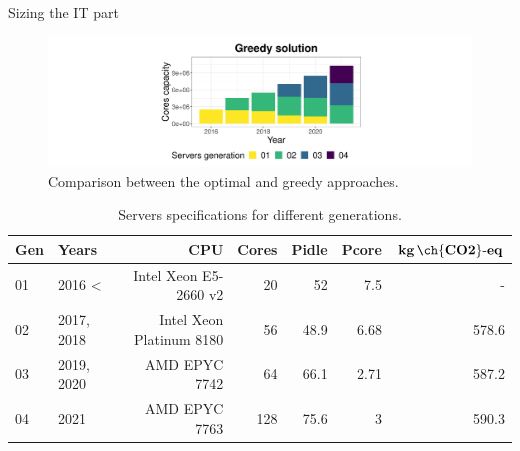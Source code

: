 \documentclass[Ligatures=TeX,table,svgnames,usetotalslideindicator,compress,10pt,aspectratio=169]{beamer}
\begin{document}
\begin{frame}{Sizing the IT part}
  \begin{center}
    \begin{figure}[h]    
      \centering
      \includegraphics[width=.9\textwidth]{images/cloud_federation_evolution_lifetime_year6.png}
      \caption{Comparison between the optimal and greedy approaches.}
    \end{figure}    
  \end{center}  

  \begin{table}[h]
  \tiny
  \label{tab:servers_specs} 
  \caption{Servers specifications for different generations.} \centering
  \begin{tabular}{|l|l|r|r|r|r|r|}
  \hline    
  \textbf{Gen} & \textbf{Years} & \textbf{CPU} &   \textbf{Cores} & \textbf{Pidle}  & \textbf{Pcore}  & \textbf{$\mathbf{kg\,\ch{CO2}\text{-}eq}$}  \\
  \hline
  01      &  2016 < & Intel Xeon E5-2660 v2 & 20 & 52 & 7.5  & -   \\
  \hline
  02 & 2017, 2018 & Intel Xeon Platinum 8180 & 56 & 48.9 & 6.68  & 578.6   \\
  \hline
  03   & 2019, 2020 & AMD EPYC 7742  & 64 & 66.1 & 2.71  & 587.2 \\
  \hline
  04   & 2021      & AMD EPYC 7763 & 128 & 75.6 & 3     & 590.3 \\
  \hline
  
\end{tabular}  
\end{table}

\end{frame}
\addtocounter{framenumber}{-1}
\end{document}
